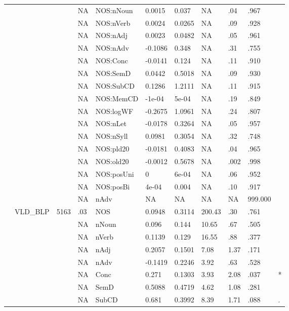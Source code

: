 \begin{table}[ht]
\begin{tabular}{lllllllllll}
   &  &  & NA & NOS:nNoun & 0.0015 & 0.037 & NA & .04 & .967 &   \\ 
   &  &  & NA & NOS:nVerb & 0.0024 & 0.0265 & NA & .09 & .928 &   \\ 
   &  &  & NA & NOS:nAdj & 0.0023 & 0.0482 & NA & .05 & .961 &   \\ 
   &  &  & NA & NOS:nAdv & -0.1086 & 0.348 & NA & .31 & .755 &   \\ 
   &  &  & NA & NOS:Conc & -0.0141 & 0.124 & NA & .11 & .910 &   \\ 
   &  &  & NA & NOS:SemD & 0.0442 & 0.5018 & NA & .09 & .930 &   \\ 
   &  &  & NA & NOS:SubCD & 0.1286 & 1.2111 & NA & .11 & .915 &   \\ 
   &  &  & NA & NOS:MemCD & -1e-04 & 5e-04 & NA & .19 & .849 &   \\ 
   &  &  & NA & NOS:logWF & -0.2675 & 1.0961 & NA & .24 & .807 &   \\ 
   &  &  & NA & NOS:nLet & -0.0178 & 0.3264 & NA & .05 & .957 &   \\ 
   &  &  & NA & NOS:nSyll & 0.0981 & 0.3054 & NA & .32 & .748 &   \\ 
   &  &  & NA & NOS:pld20 & -0.0181 & 0.4083 & NA & .04 & .965 &   \\ 
   &  &  & NA & NOS:old20 & -0.0012 & 0.5678 & NA & .002 & .998 &   \\ 
   &  &  & NA & NOS:posUni & 0 & 6e-04 & NA & .06 & .952 &   \\ 
   &  &  & NA & NOS:posBi & 4e-04 & 0.004 & NA & .10 & .917 &   \\ 
   &  &  & NA & nAdv & NA & NA & NA & NA & 999.000 &  \\ 
   & VLD\_BLP & 5163 & .03 & NOS & 0.0948 & 0.3114 & 200.43 & .30 & .761 &   \\ 
   &  &  & NA & nNoun & 0.096 & 0.144 & 10.65 & .67 & .505 &   \\ 
   &  &  & NA & nVerb & 0.1139 & 0.129 & 16.55 & .88 & .377 &   \\ 
   &  &  & NA & nAdj & 0.2057 & 0.1501 & 7.08 & 1.37 & .171 &   \\ 
   &  &  & NA & nAdv & -0.1419 & 0.2246 & 3.92 & .63 & .528 &   \\ 
   &  &  & NA & Conc & 0.271 & 0.1303 & 3.93 & 2.08 & .037 & * \\ 
   &  &  & NA & SemD & 0.5088 & 0.4719 & 4.62 & 1.08 & .281 &   \\ 
   &  &  & NA & SubCD & 0.681 & 0.3992 & 8.39 & 1.71 & .088 & . \\ 

\end{tabular}
\end{table}
